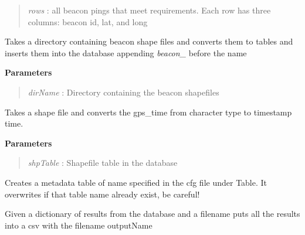 \documentclass[letterpaper,10pt,openany,oneside]{sphinxmanual}
\begin{document}
\begin{fulllineitems}
\begin{fulllineitems}
\begin{quote}
\emph{rows} : all beacon pings that meet requirements. Each row has three columns: beacon id, lat, and long
\end{quote}

\end{fulllineitems}


\begin{fulllineitems}
\label{code:Database.Database.beaconShapefilesToTables}
Takes a directory containing beacon shape files and converts them to tables and 
inserts them into the database appending \emph{beacon\_} before the name

\textbf{Parameters}
\begin{quote}

\emph{dirName} : Directory containing the beacon shapefiles
\end{quote}

\end{fulllineitems}


\begin{fulllineitems}
\label{code:Database.Database.convertGPSTime}
Takes a shape file and converts the gps\_time from character type to timestamp time.

\textbf{Parameters}
\begin{quote}

\emph{shpTable} : Shapefile table in the database
\end{quote}

\end{fulllineitems}


\begin{fulllineitems}
\label{code:Database.Database.createTblMetadata}
Creates a metadata table of name specified in the cfg file under Table. It overwrites if that table name already exist, be careful!

\end{fulllineitems}


\begin{fulllineitems}
\label{code:Database.Database.exportToCSV}
Given a dictionary of results from the database and a filename puts all the results
into a csv with the filename outputName


\end{fulllineitems}
\end{fulllineitems}
\end{document}
